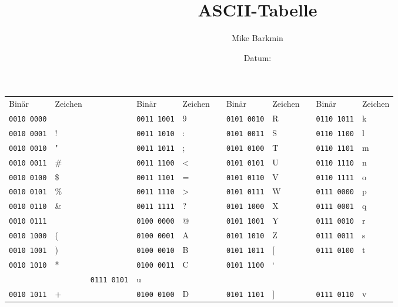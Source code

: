 \documentclass[a4paper, landscape]{scrartcl}
\title{ASCII-Tabelle}
\author{Mike Barkmin}
\date{Datum: \hspace{1.5cm}}
\begin{document}
\renewcommand{\arraystretch}{1.3}
\begin{tabularx}{\textwidth}{|YY|Y|YY|Y|YY|Y|YY|}
	Binär              & Zeichen           &  & Binär              & Zeichen &  & Binär              & Zeichen        &  & Binär               & Zeichen  \\
	\texttt{0010 0000} & \textvisiblespace &  & \texttt{0011 1001} & 9       &  & \texttt{0101 0010} & R              &  & \texttt{0110 1011} & k        \\
	\texttt{0010 0001} & !                 &  & \texttt{0011 1010} & :       &  & \texttt{0101 0011} & S              &  & \texttt{0110 1100} & l        \\
	\texttt{0010 0010} & "                 &  & \texttt{0011 1011} & ;       &  & \texttt{0101 0100} & T              &  & \texttt{0110 1101} & m        \\
	\texttt{0010 0011} & \#                &  & \texttt{0011 1100} & <       &  & \texttt{0101 0101} & U              &  & \texttt{0110 1110} & n        \\
	\texttt{0010 0100} & \$                &  & \texttt{0011 1101} & =       &  & \texttt{0101 0110} & V              &  & \texttt{0110 1111} & o        \\
	\texttt{0010 0101} & \%                &  & \texttt{0011 1110} & >       &  & \texttt{0101 0111} & W              &  & \texttt{0111 0000} & p        \\
	\texttt{0010 0110} & \&                &  & \texttt{0011 1111} & ?       &  & \texttt{0101 1000} & X              &  & \texttt{0111 0001} & q        \\
	\texttt{0010 0111} & \textquotesingle  &  & \texttt{0100 0000} & @       &  & \texttt{0101 1001} & Y              &  & \texttt{0111 0010} & r        \\
	\texttt{0010 1000} & (                 &  & \texttt{0100 0001} & A       &  & \texttt{0101 1010} & Z              &  & \texttt{0111 0011} & s        \\
	\texttt{0010 1001} & )                 &  & \texttt{0100 0010} & B       &  & \texttt{0101 1011} & [              &  & \texttt{0111 0100} & t        \\
	\texttt{0010 1010} & *                 &  & \texttt{0100 0011} & C       &  & \texttt{0101 1100} & \char`\\       &  & \texttt{0111 0101} & u        \\
	\texttt{0010 1011} & +                 &  & \texttt{0100 0100} & D       &  & \texttt{0101 1101} & ]              &  & \texttt{0111 0110} & v        \\

\end{tabularx}
\end{document}
